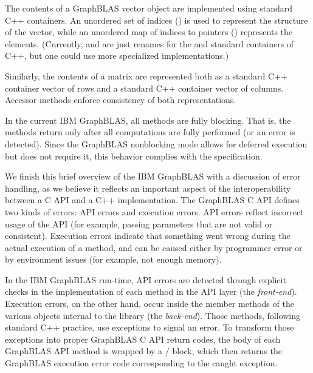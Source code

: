 The contents of a GraphBLAS vector object are implemented using standard
C++ containers.  An unordered set of indices ()
is used to represent the structure of the vector, while an unordered
map of indices to pointers () represents
the elements.  (Currently,  and  are just renames
for the  and  standard
containers of C++, but one could use more specialized implementations.)

Similarly, the contents of a matrix are represented both as a standard
C++ container vector of rows and a standard C++ container vector of
columns. Accessor methods enforce consistency of both representations.

In the current IBM GraphBLAS, all methods are fully blocking. That is,
the methods return only after all computations are fully performed (or
an error is detected).  Since the GraphBLAS nonblocking mode allows for
deferred execution but does not require it, this behavior complies with
the specification.

We finish this brief overview of the IBM GraphBLAS with a discussion
of error handling, as we believe it reflects an important aspect of the
interoperability between a C API and a C++ implementation.  The GraphBLAS
C API defines two kinds of errors: API errors and execution errors.
API errors reflect incorrect usage of the API (for example, passing
parameters that are not valid or consistent). Execution errors indicate
that something went wrong during the actual execution of a method,
and can be caused either by programmer error or by environment issues
(for example, not enough memory).

In the IBM GraphBLAS run-time, API errors are detected through
explicit checks in the implementation of each method in the API layer
(the \emph{front-end}).  Execution errors, on the other hand, occur
inside the member methods of the various objects internal to the library
(the \emph{back-end}).  Those methods, following standard C++ practice,
use exceptions to signal an error. To transform those exceptions into
proper GraphBLAS C API return codes, the body of each GraphBLAS API
method is wrapped by a / block, which then returns
the GraphBLAS execution error code corresponding to the caught exception.
